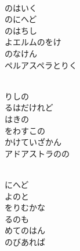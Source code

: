 \documentclass[10pt,b5j]{tarticle} %
\begin{document}
\vspace{1.5em} %
\newcommand{\linespace}{0.5em} %
\newcommand{\blocksize}{0.5\hsize} %
\newcommand{\itemmargin}{6em} %
\begin{enumerate} %
    \setlength{\itemindent}{\itemmargin} %
    \begin{minipage}[c]{\blocksize}
    
        \vspace{\linespace}
        \item~\\
        のはいく\\
        のにへど\\
        のはちし\\
        よエルムのをけ\\
        のなけん\\
        ペルアスペラとりく
        
        \vspace{\linespace}
        \item~\\
        りしの\\
        るはだけれど\\
        はきの\\
        をわすこの\\
        かけていざかん\\
        アドアストラのの
        
        \vspace{\linespace}
        \item~\\
        にへど\\
        よのと\\
        をりむかな\\
        るのも\\
        めてのはん\\
        のびあれば
        

\end{minipage}
\end{enumerate}
\end{document}
